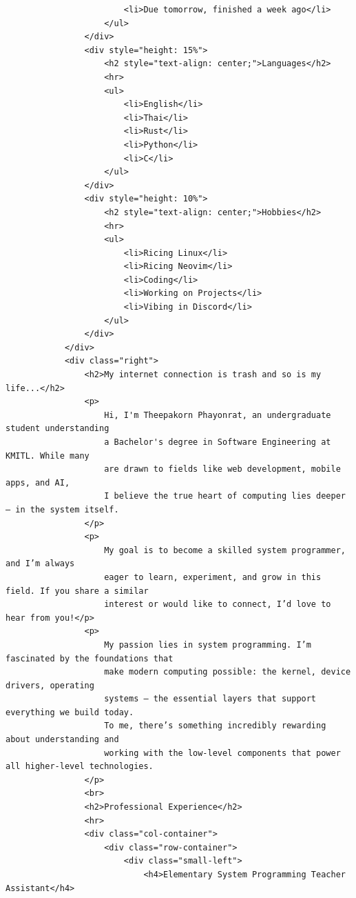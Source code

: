\documentclass[12pt]{report} %
\begin{document}
\begin{verbatim}
                        <li>Due tomorrow, finished a week ago</li>
                    </ul>
                </div>
                <div style="height: 15%">
                    <h2 style="text-align: center;">Languages</h2>
                    <hr>
                    <ul>
                        <li>English</li>
                        <li>Thai</li>
                        <li>Rust</li>
                        <li>Python</li>
                        <li>C</li>
                    </ul>
                </div>
                <div style="height: 10%">
                    <h2 style="text-align: center;">Hobbies</h2>
                    <hr>
                    <ul>
                        <li>Ricing Linux</li>
                        <li>Ricing Neovim</li>
                        <li>Coding</li>
                        <li>Working on Projects</li>
                        <li>Vibing in Discord</li>
                    </ul>
                </div>
            </div>
            <div class="right">
                <h2>My internet connection is trash and so is my life...</h2>
                <p>
                    Hi, I'm Theepakorn Phayonrat, an undergraduate student understanding 
                    a Bachelor's degree in Software Engineering at KMITL. While many 
                    are drawn to fields like web development, mobile apps, and AI, 
                    I believe the true heart of computing lies deeper — in the system itself.
                </p>
                <p>
                    My goal is to become a skilled system programmer, and I’m always 
                    eager to learn, experiment, and grow in this field. If you share a similar 
                    interest or would like to connect, I’d love to hear from you!</p>
                <p>
                    My passion lies in system programming. I’m fascinated by the foundations that 
                    make modern computing possible: the kernel, device drivers, operating 
                    systems — the essential layers that support everything we build today. 
                    To me, there’s something incredibly rewarding about understanding and 
                    working with the low-level components that power all higher-level technologies.
                </p>
                <br>
                <h2>Professional Experience</h2>
                <hr>
                <div class="col-container">
                    <div class="row-container">
                        <div class="small-left">
                            <h4>Elementary System Programming Teacher Assistant</h4>

\end{verbatim}
\end{document}
